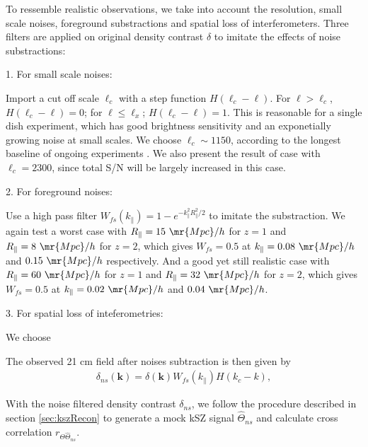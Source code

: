 To ressemble realistic observations, we take into account the resolution, small scale noises, foreground substractions 
and spatial loss of interferometers. 
Three filters are applied on original density contrast $\delta$ to imitate the effects of noise substractions:

1. For small scale noises:

Import a cut off scale $\ell_c$ 
with a step function $H(\ell_c-\ell)$. 
For $\ell>\ell_c$, $H(\ell_c-\ell)=0$; for $\ell\leqslant \ell_x$; $H(\ell_c-\ell)=1$.
This is reasonable for a single dish experiment, which
has good brightness sensitivity and an exponetially growing noise at small 
scales.
We choose $\ell_c\sim1150$, 
according to the longest baseline of ongoing experiments \cite{HIRAX,2014SPIE.9145E..22B,2014SPIE.9145E..4VN,2012IJMPS..12..256C,2015ApJ...798...40X}. 
We also present the result of case with $\ell_c=2300$, 
since total S/N will be largely increased in this case. 

2. For foreground noises:

Use a high pass filter $W_{fs}(k_\parallel)=1-e^{-k_\parallel^2R_\parallel^2/2}$ to imitate the substraction. 
We again test a worst case with 
$R_\parallel=15\ \mr{Mpc}/h$ for $z=1$ and $R_\parallel=8\ \mr{Mpc}/h$ for $z=2$, which gives
$W_{fs}=0.5$ at
$k_\parallel=0.08\ \mr{Mpc}/h$ and $0.15\ \mr{Mpc}/h$ respectively. 
And a good yet still realistic case \cite{15Shaw} with 
$R_\parallel=60\ \mr{Mpc}/h$ for $z=1$ and $R_\parallel=32\ \mr{Mpc}/h$ for $z=2$, which gives
$W_{fs}=0.5$ at
$k_\parallel=0.02\ \mr{Mpc}/h$ and $0.04\ \mr{Mpc}/h$. 

3. For spatial loss of inteferometries:

We choose  

The observed 21 cm field after noises subtraction is then given by 
\begin{eqnarray}
\label{eq:ns}
\delta_{ns}(\bm{k})=\delta(\bm{k})W_{fs}(k_\parallel)H(k_c-k),
\end{eqnarray}

With the noise filtered density contrast $\delta_{ns}$, we follow the procedure described in 
section \ref{sec:kszRecon} to generate a mock kSZ signal $\hat \Theta_{ns}$  
and calculate cross correlation $r_{\Theta\hat\Theta_{ns}}$.
